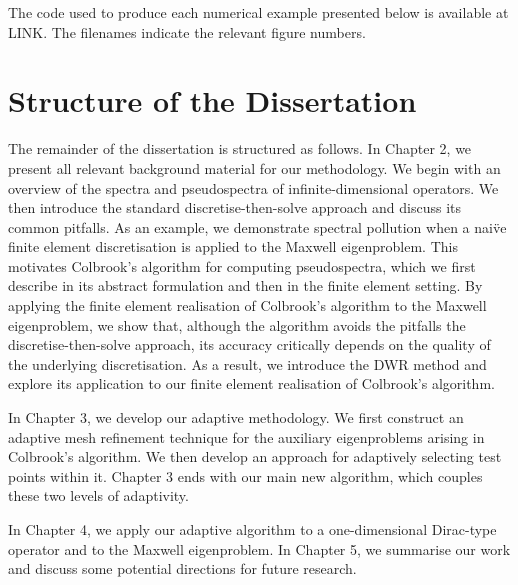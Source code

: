 The code used to produce each numerical example presented below is available at LINK. The filenames indicate the relevant figure numbers.





\section{Structure of the Dissertation}

The remainder of the dissertation is structured as follows. 
In Chapter 2, we present all relevant background material for our methodology. We begin with an overview of the spectra and pseudospectra of infinite-dimensional operators. We then introduce the standard discretise-then-solve approach and discuss its common pitfalls. As an example, we demonstrate spectral pollution when a nai\"ve finite element discretisation is applied to the Maxwell eigenproblem. This motivates Colbrook's algorithm for computing pseudospectra, which we first describe in its abstract formulation and then in the finite element setting. By applying the finite element realisation of Colbrook's algorithm to the Maxwell eigenproblem, we show that, although the algorithm avoids the pitfalls the discretise-then-solve approach, its accuracy critically depends on the quality of the underlying discretisation. As a result, we introduce the DWR method 
and explore its application to our finite element realisation of Colbrook's algorithm. 

In Chapter 3, we develop our adaptive methodology. We first construct an adaptive mesh refinement technique for the auxiliary eigenproblems arising in Colbrook's algorithm. We then develop an approach for adaptively selecting test points within it. Chapter 3 ends with our main new algorithm, which couples these two levels of adaptivity. 

In Chapter 4, we apply our adaptive algorithm to a one-dimensional Dirac-type operator and to the Maxwell eigenproblem. In Chapter 5, we summarise our work and discuss some potential directions for future research.

